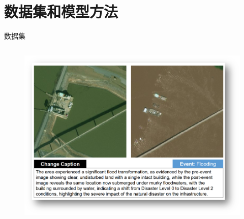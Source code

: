 \documentclass[11pt,aspectratio=169]{beamer}
\begin{document}
\section{数据集和模型方法}
\begin{frame}{数据集}
    \begin{columns}
        \begin{column}{0.6\textwidth}
            \begin{figure}
                \centering
                \includegraphics[width=0.9\linewidth]{imagens/rscc.png}


\end{figure}
\end{column}
\end{columns}
\end{frame}
\end{document}
